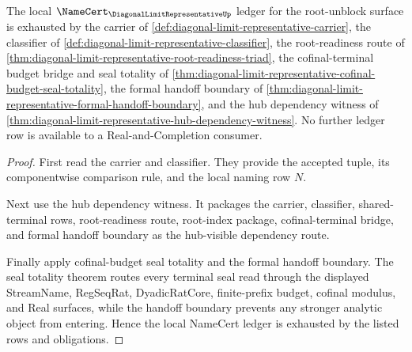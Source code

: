 \begin{theorem}
\label{thm:diagonal-limit-representative-namecert-ledger}
The local $\NameCert_{\DiagonalLimitRepresentativeUp}$ ledger for the root-unblock surface is exhausted by the carrier of \autoref{def:diagonal-limit-representative-carrier}, the classifier of \autoref{def:diagonal-limit-representative-classifier}, the root-readiness route of \autoref{thm:diagonal-limit-representative-root-readiness-triad}, the cofinal-terminal budget bridge and seal totality of \autoref{thm:diagonal-limit-representative-cofinal-budget-seal-totality}, the formal handoff boundary of \autoref{thm:diagonal-limit-representative-formal-handoff-boundary}, and the hub dependency witness of \autoref{thm:diagonal-limit-representative-hub-dependency-witness}. No further ledger row is available to a Real-and-Completion consumer.
\end{theorem}
\begin{proof}
First read the carrier and classifier. They provide the accepted tuple, its componentwise comparison rule, and the local naming row $N$.

Next use the hub dependency witness. It packages the carrier, classifier, shared-terminal rows, root-readiness route, root-index package, cofinal-terminal bridge, and formal handoff boundary as the hub-visible dependency route.

Finally apply cofinal-budget seal totality and the formal handoff boundary. The seal totality theorem routes every terminal seal read through the displayed StreamName, RegSeqRat, DyadicRatCore, finite-prefix budget, cofinal modulus, and Real surfaces, while the handoff boundary prevents any stronger analytic object from entering. Hence the local NameCert ledger is exhausted by the listed rows and obligations.
\end{proof}

